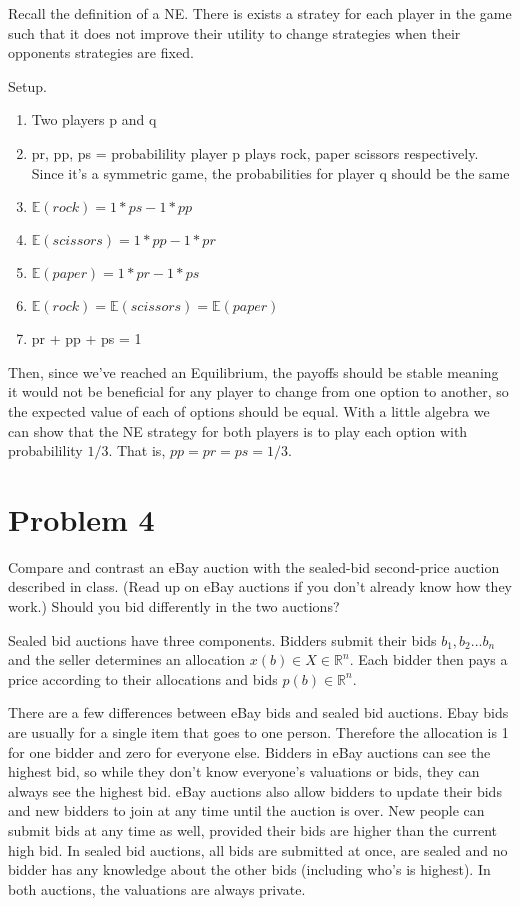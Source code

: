 \documentclass{article}
\begin{document}
Recall the definition of a NE.  There is exists a stratey for each player in
		the game such that it does not improve their utility to change
		strategies when their opponents strategies are fixed.

Setup.  
\begin{enumerate}
\item Two players p and q
\item pr, pp, ps = probabilility player p plays rock, paper scissors
	respectively.  Since it's a symmetric game, the probabilities for player q
		should be the same

\item$\mathbb{E}(rock) = 1*ps - 1*pp$
\item$\mathbb{E}(scissors) = 1*pp - 1*pr$
\item$\mathbb{E}(paper) = 1*pr - 1*ps$
\item$\mathbb{E}(rock) = \mathbb{E}(scissors) = \mathbb{E}(paper)$
\item pr + pp + ps = 1
\end{enumerate}

Then, since we've reached an Equilibrium, the payoffs should be stable meaning
it would not be beneficial for any player to change from one option to
another, so the expected value of each of options should be equal.  With a
little algebra we can show that the NE strategy for both players is to play
each option with probabilility $1/3$.  That is, $pp = pr = ps = 1/3$.

\section*{Problem 4}
Compare and contrast an eBay auction with the sealed-bid second-price auction described in class. (Read up on eBay auctions if you don’t already know how they work.) Should you bid differently in the two auctions?

Sealed bid auctions have three components.  Bidders submit their bids ${b_1,
b_2...b_n}$ and the seller determines an allocation $x(b) \in X \in
\mathbb{R}^n$.  Each bidder then pays a price according to their allocations
and bids $p(b) \in \mathbb{R}^n$. 

There are a few differences between eBay bids and sealed bid auctions.  Ebay
bids are usually for a single item that goes to one person.  Therefore the
allocation is 1 for one bidder and zero for everyone else. Bidders in eBay
auctions can see the highest bid, so while they don't know everyone's
valuations or bids, they can always see the highest bid.  eBay auctions also
allow bidders to update their bids and new bidders to join at any time until
the auction is over. New people can submit bids at any time as well, provided their bids
are higher than the current high bid.  In sealed bid auctions, all bids
are submitted at once, are sealed and no bidder has any knowledge about the
other bids (including who's is highest). In both auctions, the valuations are
always private.
\end{document}
